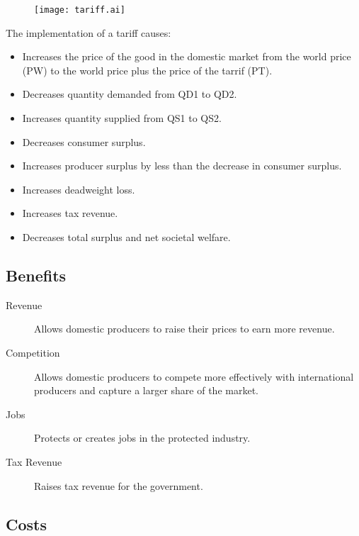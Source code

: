\documentclass[a4paper,11pt]{article}
\begin{document}
\begin{figure}
\begin{center}
\texttt{[image: tariff.ai]}
\end{center}
\end{figure}

The implementation of a tariff causes:

\begin{itemize}
\item Increases the price of the good in the domestic market from the world
	price (PW) to the world price plus the price of the tarrif (PT).
\item Decreases quantity demanded from QD1 to QD2.
\item Increases quantity supplied from QS1 to QS2.
\item Decreases consumer surplus.
\item Increases producer surplus by less than the decrease in consumer surplus.
\item Increases deadweight loss.
\item Increases tax revenue.
\item Decreases total surplus and net societal welfare.
\end{itemize}


\subsection{Benefits}

\begin{description}
\item [Revenue] Allows domestic producers to raise their prices to earn
	more revenue.
\item [Competition] Allows domestic producers to compete more effectively with
	international producers and capture a larger share of the market.
\item [Jobs] Protects or creates jobs in the protected industry.
\item [Tax Revenue] Raises tax revenue for the government.
\end{description}


\subsection{Costs}
\end{document}
